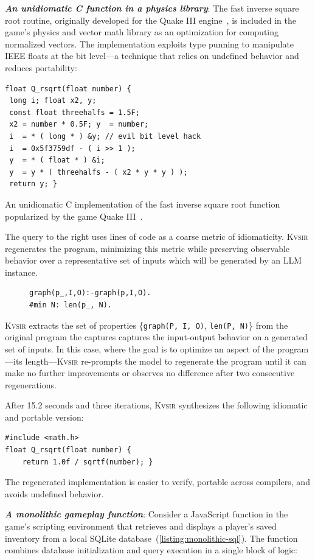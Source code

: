\documentclass[sigplan,review,anonymous,10pt]{acmart}
\newcommand{\sys}{{\scshape Kv{\textalpha}sir}\xspace}
\newcommand{\heading}[1]{\vspace{2pt}\noindent\textbf{\emph{#1}}:\enspace}
\newcommand{\prop}[1]{\setlength{\fboxsep}{1.75pt}\colorbox{lightperiwinkle}{\texttt{#1}}}
\begin{document}
\heading{An unidiomatic C function in a physics library}
The fast inverse square root routine, originally developed for the Quake III
engine~\cite{fast_inv_sqrt}, is included in the game's physics and vector math
library as an optimization for computing normalized vectors.
The implementation
exploits type punning to manipulate IEEE floats at the bit level—a technique
that relies on undefined behavior and reduces portability:
\begin{listing}
\begin{verbatim}
float Q_rsqrt(float number) {
 long i; float x2, y;
 const float threehalfs = 1.5F;
 x2 = number * 0.5F; y  = number;
 i  = * ( long * ) &y; // evil bit level hack
 i  = 0x5f3759df - ( i >> 1 );
 y  = * ( float * ) &i;
 y  = y * ( threehalfs - ( x2 * y * y ) );
 return y; }
\end{verbatim}
\caption{An unidiomatic C implementation of the fast inverse square root function popularized by the game Quake III~\cite{fast_inv_sqrt}.}
\end{listing}
The query to the right uses lines of code as a coarse metric of
idiomaticity. \sys regenerates the program, minimizing this metric while
preserving observable behavior over a representative set of inputs which will be generated by an LLM instance.
\begin{figure}
\begin{verbatim}
graph(p_,I,O):-graph(p,I,O).
#min N: len(p_, N).
\end{verbatim}
\end{figure}
\sys extracts the set of properties \{\prop{graph(P, I, O)}, \prop{len(P, N)}\}
from the original program
the captures captures the input-output behavior on a generated set of
inputs.
In this case, where the goal is to optimize an aspect of the program---its length---\sys
re-prompts the model to regenerate the program until it can make no further
improvements or observes no difference after two consecutive regenerations.

After 15.2 seconds and three iterations, \sys synthesizes the following idiomatic and portable version:
\begin{verbatim}
#include <math.h>
float Q_rsqrt(float number) {
    return 1.0f / sqrtf(number); }
\end{verbatim}
The regenerated implementation is easier to verify, portable across compilers, and avoids undefined behavior.

\heading{A monolithic gameplay function}
Consider a JavaScript function in the game's scripting environment that
retrieves and displays a player's saved inventory from a local SQLite database~(\cref{listing:monolithic-sql}).
The function combines database initialization and query execution in a single
block of logic:
\end{document}
